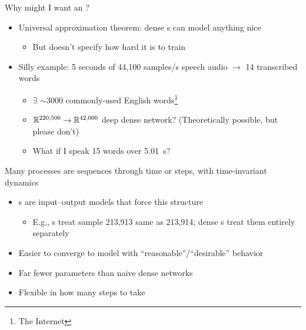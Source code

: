 \begin{frame}{Why might I want an \rnn?}
    \begin{itemize}
        \item Universal approximation theorem: dense \nn{}s can model anything nice
        \begin{itemize}
            \item But doesn't specify how hard it is to train
        \end{itemize}
        \item Silly example: 5 seconds of 44,100 samples/s speech audio $\rightarrow$ 14 transcribed words
        \begin{itemize}
            \item $\exists$ $\sim$3000 commonly-used English words\footnote{The Internet}
            \item $\mathbb{R}^{220,500} \to \mathbb{R}^{42,000}$ deep dense network?
            (Theoretically possible, but please don't)
            \item What if I speak 15 words over 5.01~s?
        \end{itemize}
    \end{itemize}
    \pause

    \begin{block}{}
        Many processes are sequences through \alert{time} or \alert{steps}, with \alert{time-invariant dynamics}
    \end{block}
    \pause

    \begin{itemize}
        \item \rnn{}s are input--output models that force this structure
        \begin{itemize}
            \item E.g., \rnn{}s treat sample 213,913 same as 213,914; dense \nn{}s treat them entirely separately
        \end{itemize}
        \item Easier to converge to model with ``reasonable''/``desirable'' behavior
        \item Far fewer parameters than naive dense networks
        \item Flexible in how many steps to take
    \end{itemize}
\end{frame}

